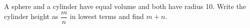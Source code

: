 A sphere and a cylinder have equal volume and both have radius 10. Write the cylinder height as $\dfrac{m}{n}$ in lowest terms and find $m+n$.
